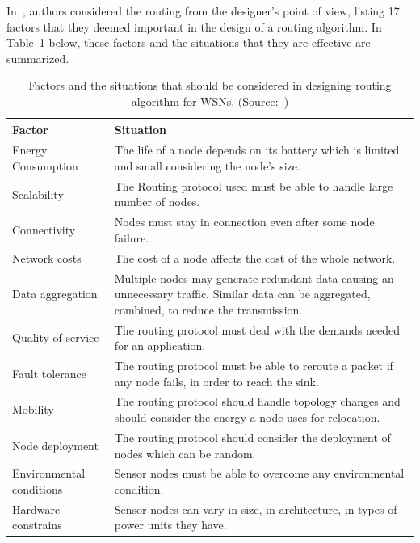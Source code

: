 \documentclass[12pt, oneandhalf, chaparabic, sees, ms]{metu}
\begin{document}
\pagebreak

In~\cite{bazzi2015}, authors considered the routing from the designer's point of view, listing 17 factors that they deemed important in the design of a routing algorithm. 
In Table~\ref{tab:bazzi} below, these factors and the situations that they are effective are summarized.


\renewcommand{\arraystretch}{1.25}%
\begin{table}[H]
\begin{center}
\caption{Factors and the situations that should be considered in designing routing algorithm for WSNs. (Source:~\protect\cite{bazzi2015})}
\label{tab:bazzi}
\begin{adjustbox}{max width=\textwidth}
\begin{tabular}{| l | l |} 
\hline
\rowcolor{lightgray}
\textbf{Factor} & \textbf{Situation} \tabularnewline
\hline \hline
Energy Consumption     &  {\parbox[t]{10cm}{The life of a node depends on its battery which is limited and small considering the node's size.}} \tabularnewline \hline
Scalability            &  {\parbox[t]{10cm}{The Routing protocol used must be able to handle large number of nodes.}} \tabularnewline \hline
Connectivity           &  {\parbox[t]{10cm}{Nodes must stay in connection even after some node failure.}} \tabularnewline \hline
Network costs          &  {\parbox[t]{10cm}{The cost of a node affects the cost of the whole network.}} \tabularnewline \hline
Data aggregation       &  {\parbox[t]{10cm}{Multiple nodes may generate redundant data causing an unnecessary traffic. Similar data can be aggregated, combined, to reduce the transmission.}} \tabularnewline \hline
Quality of service     &  {\parbox[t]{10cm}{The routing protocol must deal with the demands needed for an application.}} \tabularnewline \hline
Fault tolerance        &  {\parbox[t]{10cm}{The routing protocol must be able to reroute a packet if any node fails, in order to reach the sink.}} \tabularnewline \hline
Mobility               &  {\parbox[t]{10cm}{The routing protocol should handle topology changes and should consider the energy a node uses for relocation.}} \tabularnewline \hline
Node deployment        &  {\parbox[t]{10cm}{The routing protocol should consider the deployment of nodes which can be random.}} \tabularnewline \hline
Environmental conditions &  {\parbox[t]{10cm}{Sensor nodes must be able to overcome any environmental condition.}} \tabularnewline \hline
Hardware constrains  &  {\parbox[t]{10cm}{Sensor nodes can vary in size, in architecture, in types of power units they have.}} \tabularnewline \hline

\end{tabular}
\end{adjustbox}
\end{center}
\end{table}
\end{document}
